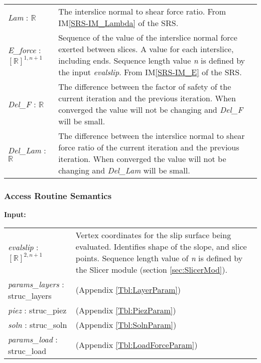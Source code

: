 \documentclass[12pt, titlepage]{article}
\begin{document}
\renewcommand*{\arraystretch}{1.5}
\begin{longtable}{ p{}  p{}}
  \textit{Lam} : $\mathbb{R}$ & The interslice normal to shear force
  ratio. From IM\ref{SRS-IM_Lambda} of the SRS. \\

  \textit{E\_force} : $[\mathbb{R}]^{1,n+1}$ & Sequence of the value
  of the interslice normal force exerted between slices. A value for
  each interslice, including ends. Sequence length value \textit{n} is
  defined by the input \textit{evalslip}. From IM\ref{SRS-IM_E} of the
  SRS. \\

  \textit{Del\_F} : $\mathbb{R}$ & The difference between the factor
  of safety of the current iteration and the previous iteration. When
  converged the value will not be changing and \textit{Del\_F} will be
  small.\\

  \textit{Del\_Lam} : $\mathbb{R}$ & The difference between the
  interslice normal to shear force ratio of the current iteration and
  the previous iteration. When converged the value will not be
  changing and \textit{Del\_Lam} will be small.\\ 
\end{longtable}
 
\subsubsection{Access Routine Semantics}

\textbf{Input:} 
\renewcommand*{\arraystretch}{1.5}
\begin{longtable}{p{} p{}}
  \textit{evalslip} : $[\mathbb{R}]^{2,n+1}$ & Vertex coordinates for
  the slip surface being evaluated. Identifies shape of the slope, and
  slice points. Sequence length value of \textit{n} is defined by the
  Slicer module (section \ref{sec:SlicerMod}).\\

  \textit{params\_layers} : struc\_layers & (Appendix
  \ref{Tbl:LayerParam})\\

  \textit{piez} : struc\_piez & (Appendix
  \ref{Tbl:PiezParam})\\

  \textit{soln} : struc\_soln & (Appendix
  \ref{Tbl:SolnParam})\\

  \textit{params\_load} : struc\_load & (Appendix
  \ref{Tbl:LoadForceParam})
\end{longtable}
\end{document}
